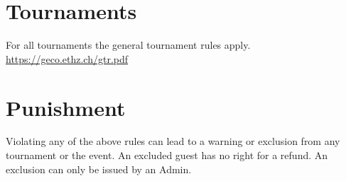 \documentclass{article}
\begin{document}
\section{Tournaments}
For all tournaments the general tournament rules apply. \\ \url{https://geco.ethz.ch/gtr.pdf}


\section{Punishment}
Violating any of the above rules can lead to a warning or exclusion from any tournament or the event.
An excluded guest has no right for a refund.
An exclusion can only be issued by an Admin.
\end{document}
